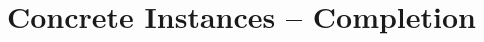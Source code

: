 \documentclass[11pt,oneside,openany]{book}
\begin{document}
\frontmatter
\mainmatter
\part{Concrete Instances -- Completion}

\end{document}
